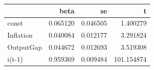 \begin{tabular}{lrrr}
\toprule
 & beta & se & t \\
\midrule
const & 0.065120 & 0.046505 & 1.400279 \\
Inflation & 0.040084 & 0.012177 & 3.291824 \\
OutputGap & 0.044672 & 0.012693 & 3.519308 \\
i(t-1) & 0.959369 & 0.009484 & 101.154874 \\
\bottomrule
\end{tabular}

